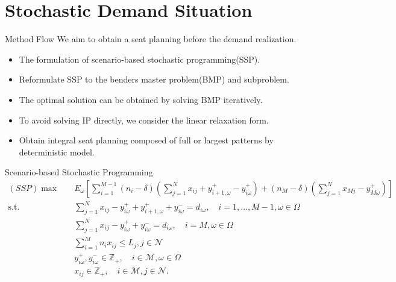 
\section{Stochastic Demand Situation}
    \frame{\sectionpage}

    \begin{frame}{Method Flow}
      We aim to obtain a seat planning before the demand realization.
      \begin{itemize}
        \item The formulation of scenario-based stochastic programming(SSP).
        \item Reformulate SSP to the benders master problem(BMP) and subproblem.
        \item The optimal solution can be obtained by solving BMP iteratively.
        \item To avoid solving IP directly, we consider the linear relaxation form.
        \item Obtain integral seat planning composed of full or largest patterns by deterministic model.
      \end{itemize}
    \end{frame}

    \begin{frame}{Scenario-based Stochastic Programming}
      \footnotesize
      \begin{equation}\label{sto_form}
        \begin{aligned}
       (SSP) \max \quad & E_{\omega}\left[\sum_{i=1}^{M-1} (n_i-\delta) (\sum_{j= 1}^{N} x_{ij} + y_{i+1,\omega}^{+} - y_{i \omega}^{+}) + (n_{M}-\delta) (\sum_{j= 1}^{N} x_{Mj} - y_{M \omega}^{+})\right] \\
        \text {s.t.} \quad & \sum_{j= 1}^{N} x_{ij}-y_{i \omega}^{+}+
        y_{i+1, \omega}^{+} + y_{i \omega}^{-}=d_{i \omega}, \quad i = 1,\ldots,M-1, \omega \in \Omega \\
        & \sum_{j= 1}^{N} x_{ij} -y_{i \omega}^{+}+y_{i \omega}^{-}=d_{i \omega}, \quad i = M, \omega \in \Omega \\
        & \sum_{i=1}^{M} n_{i} x_{ij} \leq L_j, j \in \mathcal{N}\\
        & y_{i \omega}^{+}, y_{i \omega}^{-} \in \mathbb{Z}_{+}, \quad i \in \mathcal{M}, \omega \in \Omega \\
        & x_{ij} \in \mathbb{Z}_{+}, \quad i \in \mathcal{M}, j \in \mathcal{N}.
        \end{aligned}
      \end{equation}
    \end{frame}

